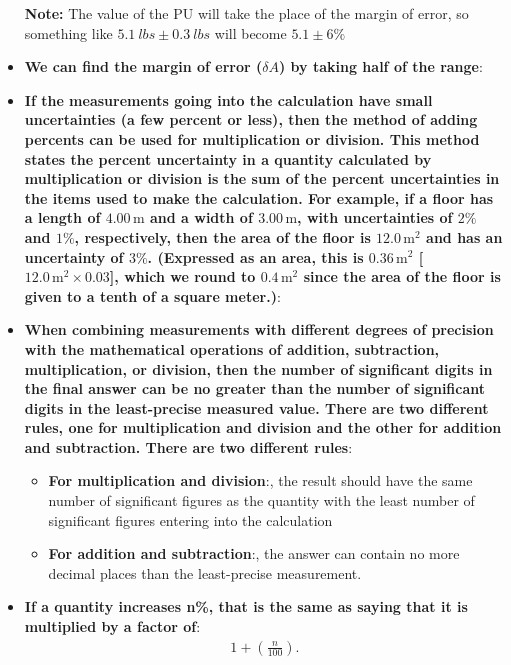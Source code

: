 \documentclass{report}
\begin{document}
\begin{itemize}
            \bigbreak \noindent 
            \textbf{Note:} The value of the PU will take the place of the margin of error, so something like $5.1\ lbs \pm 0.3\ lbs $ will become $5.1 \pm 6 \% $
        \item \textbf{We can find the margin of error ($\delta A$) by taking half of the range}:
        \item \textbf{If the measurements going into the calculation have small uncertainties (a few percent or less), then the method of adding percents can be used for multiplication or division. This method states the percent uncertainty in a quantity calculated by multiplication or division is the sum of the percent uncertainties in the items used to make the calculation. For example, if a floor has a length of \(4.00 \, \text{m}\) and a width of \(3.00 \, \text{m}\), with uncertainties of \(2\%\) and \(1\%\), respectively, then the area of the floor is \(12.0 \, \text{m}^2\) and has an uncertainty of \(3\%\). (Expressed as an area, this is \(0.36 \, \text{m}^2\) [\(12.0 \, \text{m}^2 \times 0.03\)], which we round to \(0.4 \, \text{m}^2\) since the area of the floor is given to a tenth of a square meter.)}:
        \item \textbf{    When combining measurements with different degrees of precision with the mathematical operations of addition, subtraction, multiplication, or division, then the number of significant digits in the final answer can be no greater than the number of significant digits in the least-precise measured value. There are two different rules, one for multiplication and division and the other for addition and subtraction. There are two different rules}:
            \begin{itemize}
                \item \textbf{For multiplication and division}:, the result should have the same number of significant figures as the quantity with the least number of significant figures entering into the calculation 
                \item \textbf{For addition and subtraction}:, the answer can contain no more decimal places than the least-precise measurement.
            \end{itemize}
        \item \textbf{If a quantity increases n\%, that is the same as saying that it is multiplied by a factor of}:
            \begin{align*}
                1 + \left(\frac{n}{100}\right)
            .\end{align*}

\end{itemize}
\end{document}
